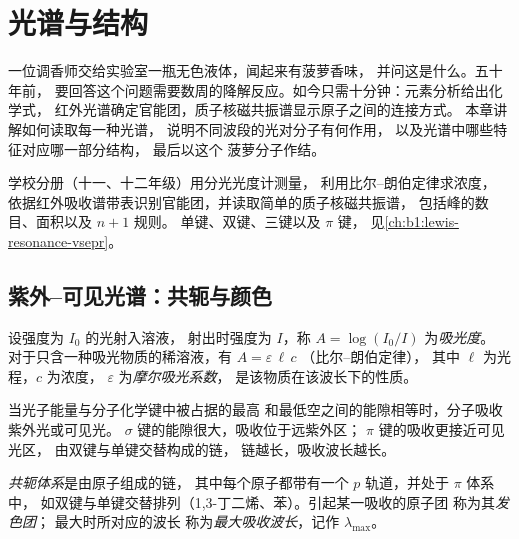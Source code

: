 \chapter{光谱与结构}\label{ch:b1:structure-spectroscopy}

一位调香师交给实验室一瓶无色液体，闻起来有菠萝香味，
并问这是什么。五十年前，
要回答这个问题需要数周的降解反应。如今只需十分钟：元素分析给出化学式，
红外光谱确定官能团，质子核磁共振谱显示原子之间的连接方式。
本章讲解如何读取每一种光谱，
说明不同波段的光对分子有何作用，
以及光谱中哪些特征对应哪一部分结构，
最后以这个
菠萝分子作结。

\begin{recall}
学校分册（十一、十二年级）用分光光度计测量，
利用比尔–朗伯定律求浓度，
依据红外吸收谱带表识别官能团，并读取简单的质子核磁共振谱，
包括峰的数目、面积以及 $n + 1$ 规则。
单键、双键、三键以及 $\pi$ 键，
见\cref{ch:b1:lewis-resonance-vsepr}。
\end{recall}

\section{紫外–可见光谱：共轭与颜色}

\begin{definition}\label{def:b1:structure-spectroscopy:absorbance}
设强度为 $I_0$ 的光射入溶液，
射出时强度为 $I$，称 $A = \log(I_0/I)$ 为\emph{吸光度}。
对于只含一种吸光物质的稀溶液，有 $A = \varepsilon\,\ell\,c$
（比尔–朗伯定律），
其中 $\ell$ 为光程，$c$ 为浓度，
$\varepsilon$ 为\emph{摩尔吸光系数}，
是该物质在该波长下的性质。
\end{definition}

当光子能量与分子化学键中被占据的最高
和最低空之间的能隙相等时，分子吸收紫外光或可见光。
$\sigma$ 键的能隙很大，吸收位于远紫外区；
$\pi$ 键的吸收更接近可见光区，
由双键与单键交替构成的链，
链越长，吸收波长越长。

\begin{definition}\label{def:b1:structure-spectroscopy:conjugation}
\emph{共轭体系}是由原子组成的链，
其中每个原子都带有一个 $p$ 轨道，并处于 $\pi$ 体系中，
如双键与单键交替排列（1,3-丁二烯、苯）。引起某一吸收的原子团
称为其\emph{发色团}；
最大时所对应的波长
称为\emph{最大吸收波长}，记作 $\lambda_{\max}$。
\end{definition}

